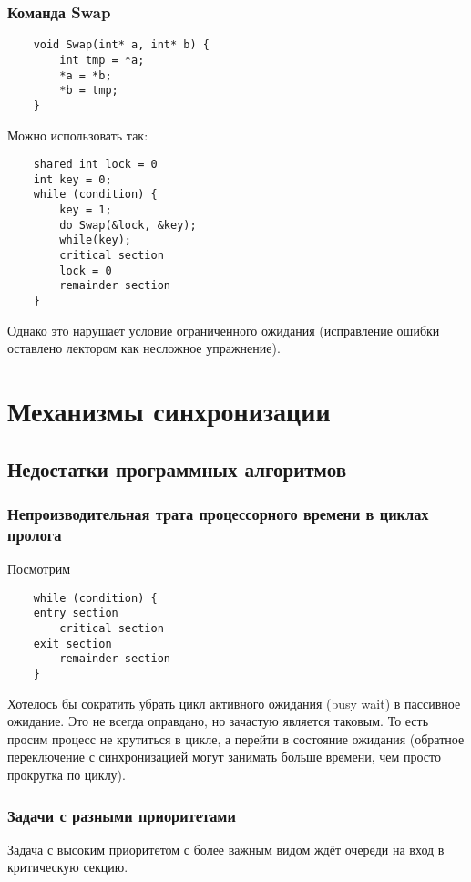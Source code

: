 \documentclass[12pt, a4paper]{article}
\begin{document}
    \subsubsection*{Команда Swap}
    \begin{lstlisting}
    void Swap(int* a, int* b) {
        int tmp = *a;
        *a = *b;
        *b = tmp;
    }
    \end{lstlisting}
    Можно использовать так:\\
    \begin{lstlisting}
    shared int lock = 0
    int key = 0;
    while (condition) {
        key = 1;
        do Swap(&lock, &key);
        while(key);
        critical section
        lock = 0
        remainder section
    }
    \end{lstlisting}
    Однако это нарушает условие ограниченного ожидания (исправление ошибки оставлено лектором как несложное упражнение).
    \section*{Механизмы синхронизации}
    \subsection*{Недостатки программных алгоритмов}
    \subsubsection*{Непроизводительная трата процессорного времени в циклах пролога}
    Посмотрим\\
    \begin{lstlisting}
    while (condition) {
    entry section
        critical section
    exit section
        remainder section
    }
    \end{lstlisting}
    Хотелось бы сократить убрать цикл активного ожидания (busy wait) в пассивное ожидание. Это не всегда оправдано, но зачастую является таковым. То есть просим процесс не крутиться в цикле, а перейти в состояние ожидания (обратное переключение с синхронизацией могут занимать больше времени, чем просто прокрутка по циклу).
    \subsubsection*{Задачи с разными приоритетами}
    Задача с высоким приоритетом с более важным видом ждёт очереди на вход в критическую секцию.
\end{document}
